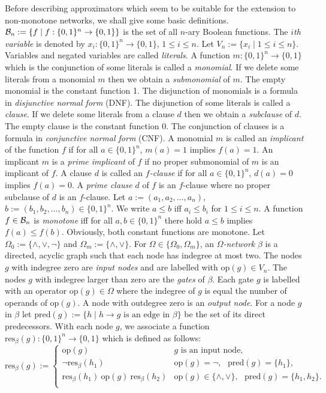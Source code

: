 \documentclass[11pt]{article}
\begin{document}
Before describing approximators which seem to be suitable for the extension to non-monotone networks,
we shall give some basic definitions. ${\cal B}_n := \{f \mid f:\{0,1\}^n \rightarrow \{0,1\}\}$ is
the set of all $n$-ary Boolean functions. The {\em $i$th variable\/} is denoted by 
$x_i:\{0,1\}^n \rightarrow \{0,1\}$, $1 \leq i \leq n$. Let $V_n := \{x_i \mid 1 \leq i \leq n\}$.
Variables and negated variables are called {\em literals\/}.
A function $m:\{0,1\}^n \rightarrow \{0,1\}$ which is the conjunction of some 
literals is called a {\em monomial}. If we delete some literals from a monomial $m$ then we
obtain a {\em submonomial} of $m$. The empty monomial is the constant function 1. 
The disjunction of monomials is a formula in {\em disjunctive normal form} (DNF).
The disjunction of some literals is called a {\em clause\/}. If we delete some literals from a
clause $d$ then we obtain a {\em subclause\/} of $d$. The empty clause is the constant
function 0. The conjunction of clauses is a formula in {\em conjunctive normal form} (CNF).
A monomial $m$ is called an {\em implicant\/} of the function $f$ if for all $a \in \{0,1\}^n$,
$m(a) = 1$ implies $f(a) = 1$. An implicant $m$ is a
{\em prime implicant\/} of $f$ if no proper submonomial of $m$ is an implicant of $f$. 
A clause $d$ is called an {\em $f$-clause\/} if for all $a \in \{0,1\}^n$, $d(a) = 0$ implies
$f(a) = 0$. A {\em prime clause\/} $d$ of $f$ is an $f$-clause where no proper subclause of $d$
is an $f$-clause. Let $a := (a_1,a_2, \ldots,a_n)$, $b := (b_1,b_2, \ldots,b_n) \in \{0,1\}^n$. 
We write $a \leq b$ iff $a_i \leq b_i$ for $1 \leq i \leq n$. A function $f \in {\cal B}_n$ is 
{\em monotone\/} iff for all $a,b \in \{0,1\}^n$ there hold $a \leq b$ implies $f(a) \leq f(b)$.
Obviously, both constant functions are monotone. Let $\Omega_0 := \{\wedge,\vee,\neg\}$ and
$\Omega_m := \{\wedge,\vee\}$. For $\Omega \in \{\Omega_0,\Omega_m\}$, an {\em $\Omega$-network\/}
$\beta$ is a directed, acyclic graph such that each node has indegree at most two. The nodes $g$ with
indegree zero are {\em input nodes\/} and are labelled with $\mbox{op}(g) \in V_n$. The nodes $g$ with indegree
larger than zero are the {\em gates\/} of $\beta$. Each gate $g$ is labelled with an operator
$\mbox{op}(g) \in \Omega$ where the indegree of $g$ is equal the number of operands of $\mbox{op}(g)$.
A node with outdegree zero is an {\em output node\/}.
For a node $g$ in $\beta$ let $\mbox{pred}(g) := \{h \mid h \rightarrow g \mbox{ is an edge in } \beta \}$ be
the set of its direct predecessors. With each node $g$, we associate a function
$\mbox{res}_{\beta}(g):\{0,1\}^n \rightarrow \{0,1\}$ which is defined as follows:
$$
\mbox{res}_{\beta}(g) := \left\{ \begin{array}{ll}
                            \mbox{op}(g) & \mbox{$g$ is an input node,} \\
                 \neg \mbox{res}_{\beta}(h_1) & \mbox{op}(g) = \neg, \mbox{ } \mbox{pred}(g) = \{h_1\}, \\
   \mbox{res}_{\beta}(h_1) \: \mbox{op}(g) \: \mbox{res}_{\beta}(h_2) & \mbox{op}(g) \in \{\wedge,\vee\}, \mbox{ }
                   \mbox{pred}(g) = \{h_1,h_2\}. \\
                            \end{array}
\right.
$$
\end{document}
